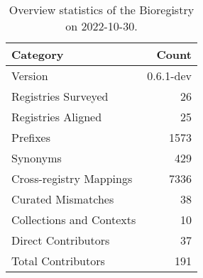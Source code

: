 \begin{table}
\centering
\caption{Overview statistics of the Bioregistry on 2022-10-30.}
\label{tab:bioregistry-summary}
\begin{tabular}{lr}
\toprule
                Category &     Count \\
\midrule
                 Version & 0.6.1-dev \\
     Registries Surveyed &        26 \\
      Registries Aligned &        25 \\
                Prefixes &      1573 \\
                Synonyms &       429 \\
 Cross-registry Mappings &      7336 \\
      Curated Mismatches &        38 \\
Collections and Contexts &        10 \\
     Direct Contributors &        37 \\
      Total Contributors &       191 \\
\bottomrule
\end{tabular}
\end{table}
